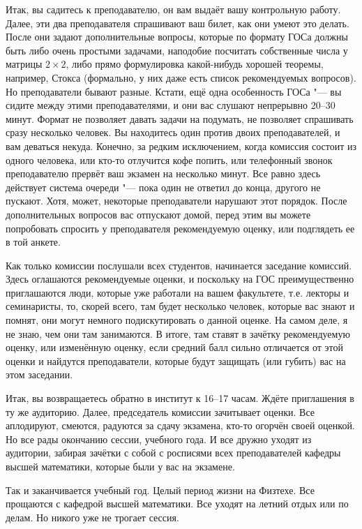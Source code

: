 Итак, вы садитесь к преподавателю, он вам выдаёт вашу контрольную работу. Далее, эти два преподавателя спрашивают ваш билет, как они умеют это делать. После они задают дополнительные вопросы, которые по формату ГОСа должны быть либо очень простыми задачами, наподобие посчитать собственные числа у матрицы $2\times 2$, либо прямо формулировка какой-нибудь хорошей теоремы, например, Стокса (формально, у них даже есть список рекомендуемых вопросов). Но преподаватели бывают разные. Кстати, ещё одна особенность ГОСа "--- вы сидите между этими преподавателями, и они вас слушают непрерывно 20--30 минут. Формат не позволяет давать задачи на подумать, не позволяет спрашивать сразу несколько человек. Вы находитесь один против двоих преподавателей, и вам деваться некуда. Конечно, за редким исключением, когда комиссия состоит из одного человека, или кто-то отлучится кофе попить, или телефонный звонок преподавателю прервёт ваш экзамен на несколько минут. Все равно здесь действует система очереди "--- пока один не ответил до конца, другого не пускают. Хотя, может, некоторые преподаватели нарушают этот порядок. После дополнительных вопросов вас отпускают домой, перед этим вы можете попробовать спросить у преподавателя рекомендуемую оценку, или подглядеть ее в той анкете.

Как только комиссии послушали всех студентов, начинается заседание комиссий. Здесь оглашаются рекомендуемые оценки, и поскольку на ГОС преимущественно приглашаются люди, которые уже работали на вашем факультете, т.е. лекторы и семинаристы, то, скорей всего, там будет несколько человек, которые вас знают и помнят, они могут немного подискутировать о данной оценке. На самом деле, я не знаю, чем они там занимаются. В итоге, там ставят в зачётку рекомендуемую оценку, или изменённую оценку, если средний балл сильно отличается от этой оценки и найдутся преподаватели, которые будут защищать (или губить) вас на этом заседании.

Итак, вы возвращаетесь обратно в институт к 16--17 часам. Ждёте приглашения в ту же аудиторию. Далее, председатель комиссии зачитывает оценки. Все аплодируют, смеются, радуются за сдачу экзамена, кто-то огорчён своей оценкой. Но все рады окончанию сессии, учебного года. И все дружно уходят из аудитории, забирая зачётки с собой с росписями всех преподавателей кафедры высшей математики, которые были у вас на экзамене.

Так и заканчивается учебный год. Целый период жизни на Физтехе. Все прощаются с кафедрой высшей математики. Все уходят на летний отдых или по делам. Но никого уже не трогает сессия.

